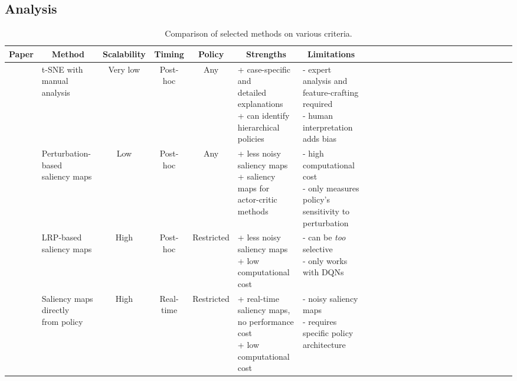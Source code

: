 \documentclass[sigconf]{acmart}
\begin{document}
\subsection{Analysis}
\newcommand{\vpad}{\\[8mm]}
\begin{table}[t!]
\centering
\caption{Comparison of selected methods on various criteria.}
\begin{tabular}{clcccll}

\textbf{Paper} & \multicolumn{1}{c}{\textbf{Method}} & \textbf{Scalability} & \textbf{Timing} & \textbf{Policy} & \multicolumn{1}{c}{\textbf{Strengths}} & \multicolumn{1}{c}{\textbf{Limitations}} \\ \hline

\cite{Zahavy2016} & \makecell[l]{t-SNE with\\manual analysis} & Very low & Post-hoc & Any\footnotemark[1] & \makecell[l]{+ case-specific and\\detailed explanations\\+ can identify\\hierarchical policies} & \makecell[l]{- expert analysis and\\feature-crafting required\\- human interpretation\\adds bias} \vpad

\cite{Greydanus2018} & \makecell[l]{Perturbation-based\\saliency maps} & Low & Post-hoc & Any\footnotemark[1] & \makecell[l]{+ less noisy saliency maps\\+ saliency maps for\\actor-critic methods} & \makecell[l]{- high computational cost\\- only measures policy's\\sensitivity to perturbation} \vpad

\cite{Huber2019} & \makecell[l]{LRP-based\\saliency maps} & High & Post-hoc & Restricted & \makecell[l]{+ less noisy saliency maps\\+ low computational cost} & \makecell[l]{- can be \textit{too} selective\\- only works with DQNs} \vpad

\cite{Nikulin2019} & \makecell[l]{Saliency maps directly\\from policy} & High & Real-time & Restricted & \makecell[l]{+ real-time saliency maps,\\no performance cost\\+ low computational cost} & \makecell[l]{- noisy saliency maps\\- requires specific policy\\architecture} \vpad


\end{tabular}
\end{table}
\end{document}

